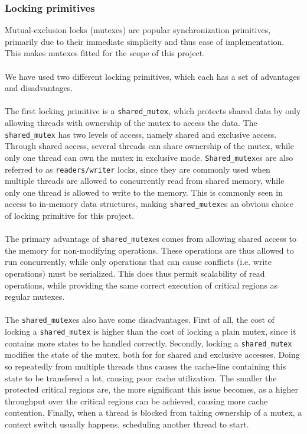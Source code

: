 \documentclass[11pt]{article} %
\begin{document}
\subsubsection{Locking primitives}
\label{subsubsec:design_locking_primitives}
Mutual-exclusion locks (mutexes) are popular synchronization primitives, primarily due to their immediate simplicity and thus ease of implementation. This makes mutexes fitted for the scope of this project. \\
\\
We have used two different locking primitives, which each has a set of advantages and disadvantages.\\
\\
The first locking primitive is a \verb|shared_mutex|, which protects shared data by only allowing threads with ownership of the mutex to access the data. The \verb|shared_mutex| has two levels of access, namely shared and exclusive access. Through shared access, several threads can share ownership of the mutex, while only one thread can own the mutex in exclusive mode. \verb|Shared_mutex|es are also referred to as \verb|readers/writer| locks, since they are commonly used when multiple threads are allowed to concurrently read from shared memory, while only one thread is allowed to write to the memory. This is commonly seen in access to in-memory data structures, making \verb|shared_mutex|es an obvious choice of locking primitive for this project.\\
\\
The primary advantage of \verb|shared_mutex|es comes from allowing shared access to the memory for non-modifying operations. These operations are thus allowed to run concurrently, while only operations that can cause conflicts (i.e. write operations) must be serialized. This does thus permit scalability of read operations, while providing the same correct execution of critical regions as regular mutexes. \\
\\
The \verb|shared_mutex|es also have some disadvantages. First of all, the cost of locking a \verb|shared_mutex| is higher than the cost of locking a plain mutex, since it contains more states to be handled correctly. Secondly, locking a \verb|shared_mutex| modifies the state of the mutex, both for for shared and exclusive accesses. Doing so repeatedly from multiple threads thus causes the cache-line containing this state to be transfered a lot, causing poor cache utilization. The smaller the protected critical regions are, the more significant this issue becomes, as a higher throughput over the critical regions can be achieved, causing more cache contention. Finally, when a thread is blocked from taking ownership of a mutex, a context switch usually happens, scheduling another thread to start.\\
\end{document}
